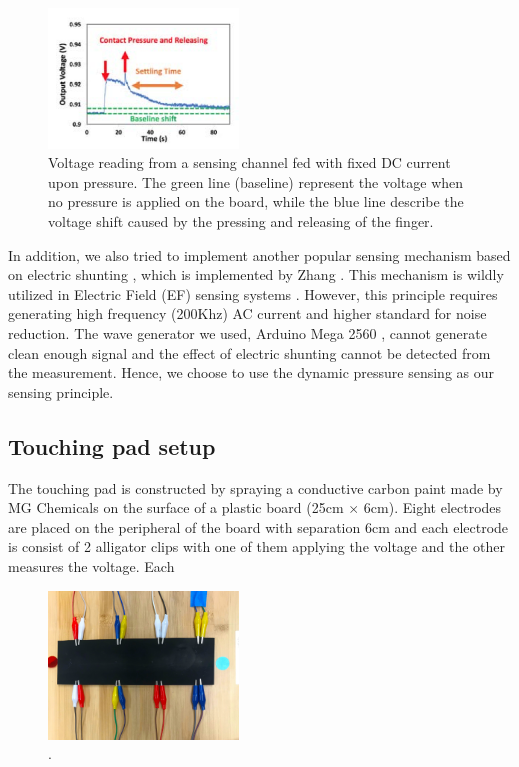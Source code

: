 \documentclass[reprint,amsmath, amsfonts, amssymb, aps, letterpaper]{revtex4-1}
\begin{document}
\begin{figure}[h]
\centering
    \includegraphics[width=0.45\textwidth]{./figure/pressure}     
       \caption{Voltage reading from a sensing channel fed with fixed DC current upon pressure. The green line (baseline) represent the voltage when no pressure is applied on the board, while the blue line describe the voltage shift caused by the pressing and releasing of the finger. \citep{isoft} }
    \label{fig::pressure}
\end{figure}

In addition, we also tried to implement another popular sensing mechanism based on electric shunting \cite{shunt}, which is implemented by Zhang \cite{electrick}. This mechanism is wildly utilized in Electric Field (EF) sensing systems \cite{ef}. However, this principle requires generating high frequency (200Khz) AC current and higher standard for noise reduction. The wave generator we used, Arduino Mega 2560 \citep{arduino}, cannot generate clean enough signal and the effect of electric shunting cannot be detected from the measurement. Hence, we choose to use the dynamic pressure sensing as our sensing principle.
\subsection{Touching pad setup}
The touching pad is constructed by spraying a conductive carbon paint made by MG Chemicals \citep{carbon} on the surface of a plastic board (25cm $\times$ 6cm). Eight electrodes are placed on the peripheral of the board with separation 6cm and each electrode is consist of 2 alligator clips with one of them applying the voltage and the other measures the voltage. Each 
\begin{figure}[h]
\centering
    \includegraphics[width=0.45\textwidth]{./figure/pad}     
       \caption{. \citep{isoft} }
    \label{fig::pad}
\end{figure}
\end{document}
